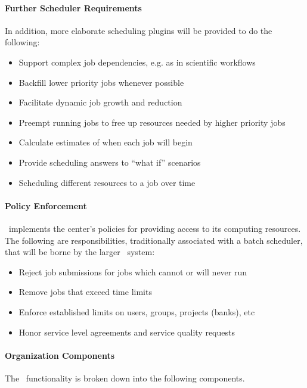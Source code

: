 \paragraph{Further Scheduler Requirements}

In addition, more elaborate scheduling plugins will be provided to do
the following:

\begin{itemize}
  \item Support complex job dependencies, e.g. as in scientific workflows
  \item Backfill lower priority jobs whenever possible
  \item Facilitate dynamic job growth and reduction
  \item Preempt running jobs to free up resources needed by higher priority jobs
  \item Calculate estimates of when each job will begin
  \item Provide scheduling answers to ``what if'' scenarios
  \item Scheduling different resources to a job over time
\end{itemize}

\paragraph{Policy Enforcement}

\ngrm\ implements the center's policies for providing access to its
computing resources.  The following are responsibilities,
traditionally associated with a batch scheduler, that will be borne by
the larger \ngrm\ system:

\begin{itemize}
  \item Reject job submissions for jobs which cannot or will never run
  \item Remove jobs that exceed time limits
  \item Enforce established limits on users, groups, projects (banks), etc
  \item Honor service level agreements and service quality requests
\end{itemize}

\paragraph{Organization Components}

The \ngjs\ functionality is broken down into the following components.

